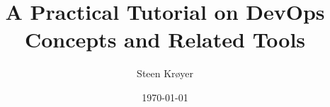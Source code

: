 \documentclass[12pt,a4paper]{report}
\title{A Practical Tutorial on DevOps Concepts and Related Tools}
\author{Steen Krøyer}
\date{\today}
\begin{document}




\begin{figure}
    \centering
    
\end{figure}
\end{document}
